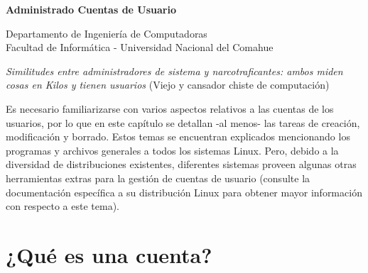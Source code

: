 ﻿

\usepackage{fancyhdr}
        \pagestyle{fancy}
\usepackage{lastpage}
        \lhead{}
        \chead{}
        \rhead{}
        \cfoot{}
        \renewcommand{\headrulewidth}{0.0pt}
        \renewcommand{\footrulewidth}{0.4pt}

\def\ti#1#2{\texttt{#1} & #2 \\ }





\setlength{\parindent}{0pt}


\makeatletter
{\color{bl} \centering \huge \sc \textbf{
Administrado Cuentas de Usuario \\
\vspace*{8pt} }\par}
\makeatother


\makeatletter
{\centering \small 
        Departamento de Ingeniería de Computadoras \\
        Facultad de Informática - Universidad Nacional del Comahue \\
        \vspace{20pt} }
\makeatother





\textit{Similitudes entre administradores de sistema y
narcotraficantes: ambos miden cosas en Kilos y tienen usuarios} (Viejo y
cansador chiste de computación)

Es necesario familiarizarse con varios aspectos relativos a las
cuentas de los usuarios, por lo que en este capítulo se detallan 
-al menos- las tareas de creación, modificación y borrado.
Estos temas se encuentran explicados
mencionando los programas y archivos generales a todos los sistemas Linux.
Pero, debido a la diversidad de distribuciones existentes,
diferentes sistemas proveen algunas otras herramientas extras para la gestión de cuentas de usuario (consulte la documentación
específica a su distribución Linux para obtener mayor información con 
respecto a este tema).

		
\section{ ¿Qué es una cuenta?}

